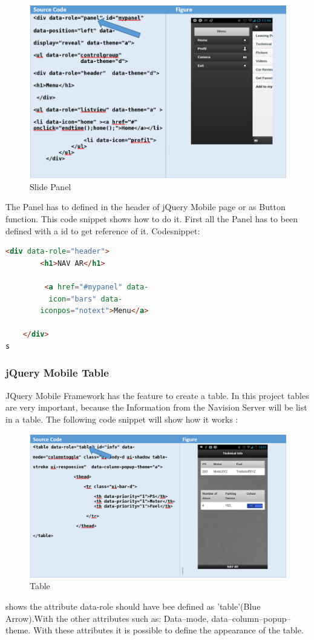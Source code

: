 \begin{figure}[h]
\centering
\includegraphics[width=1.0\linewidth]{graphics/SPanel.PNG}
\caption{Slide Panel}
\end{figure}
\clearpage

The Panel has to defined in the header of jQuery Mobile page or as Button function. This  code snippet  shows how to do it. First all the Panel has to been defined with a id to get reference of it.
Codesnippet:
\begin{lstlisting}[language=html,caption= Panel definition in Header,captionpos=b]
<div data-role="header">
        <h1>NAV AR</h1>

         <a href="#mypanel" data- 
          icon="bars" data- 
        iconpos="notext">Menu</a>

    </div>
s
\end{lstlisting}
\subsubsection{jQuery Mobile Table}
JQuery Mobile Framework has the feature to create a table. In this project tables are very important, because the Information from the Navision Server will be list in a table. The following code snippet will show how it works :
\begin{figure}[H]
\centering
\includegraphics[width=1.0\linewidth]{graphics/Table.PNG}
\caption{Table}
\end{figure}
shows the attribute data-role should have bee defined as 'table'(Blue Arrow).With the other attributes such as:
Data--mode, data--column--popup--theme. With these attributes it is possible to define the appearance of the table.

